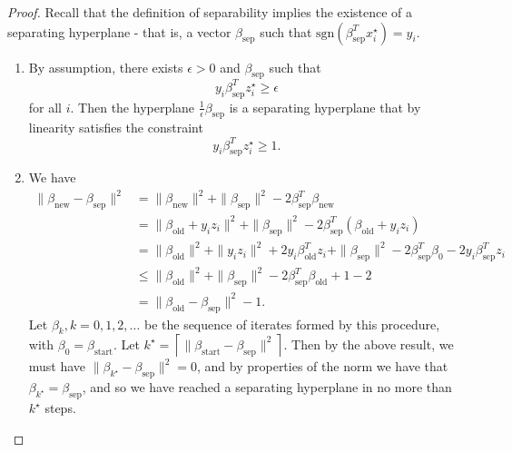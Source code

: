 \begin{proof}
    Recall that the definition of separability implies the existence of a separating hyperplane - that is, a vector $\beta_\text{sep}$ such that $\text{sgn}\left( \beta^T_\text{sep} x^\star_i \right) = y_i$.
    \begin{enumerate}
        \item By assumption, there exists $\epsilon > 0$ and $\beta_\text{sep}$ such that \[
                y_i \beta^T_\text{sep} z^\star_i \geq \epsilon
            \] for all $i$.  Then the hyperplane $\frac{1}{\epsilon} \beta_\text{sep}$ is a separating hyperplane that by linearity satisfies the constraint \[
                y_i \beta^T_\text{sep} z^\star_i \geq 1.
            \]
        \item We have \begin{align*}
                \| \beta_\text{new} - \beta_\text{sep} \|^2 &= \| \beta_\text{new} \|^2 + \| \beta_\text{sep} \|^2 - 2 \beta_\text{sep}^T \beta_\text{new} \\
                &= \| \beta_\text{old} + y_i z_i \|^2 + \| \beta_\text{sep} \|^2 - 2 \beta_\text{sep}^T \left( \beta_\text{old} + y_i z_i \right) \\
                &= \| \beta_\text{old} \|^2 + \| y_i z_i \|^2 + 2 y_i \beta_\text{old}^T z_i + \| \beta_\text{sep} \|^2 - 2 \beta_\text{sep}^T \beta_0 - 2 y_i \beta^T_\text{sep} z_i \\
                &\leq \| \beta_\text{old} \|^2 + \| \beta_\text{sep} \|^2 - 2 \beta_\text{sep}^T \beta_\text{old} + 1 - 2 \\
                &= \| \beta_\text{old} - \beta_\text{sep} \|^2 - 1.
            \end{align*} Let $\beta_k, k = 0, 1, 2, \dots$ be the sequence of iterates formed by this procedure, with $\beta_0 = \beta_\text{start}$. Let $k^\star = \left\lceil \| \beta_\text{start} - \beta_\text{sep} \|^2 \right\rceil$.  
            Then by the above result, we must have $\| \beta_{k^\star} - \beta_\text{sep} \|^2 = 0$, and by properties of the norm we have that $\beta_{k^\star} = \beta_\text{sep}$, and so we have reached a separating hyperplane in no more than $k^\star$ steps.
    \end{enumerate} 
\end{proof}
